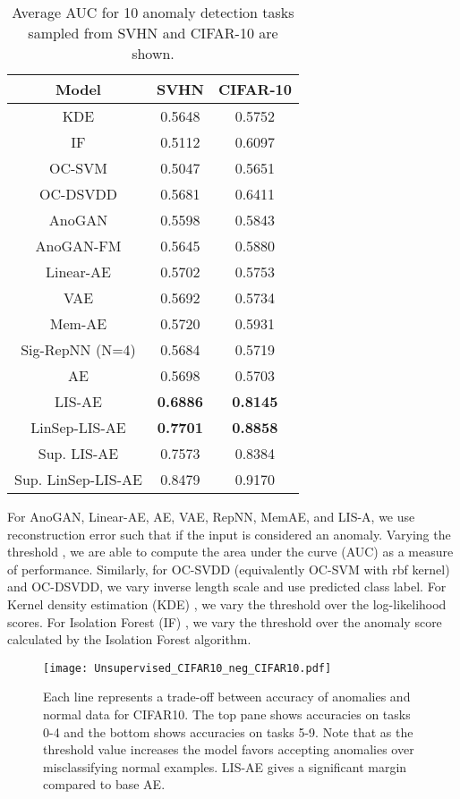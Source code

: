 \documentclass[acmtog, nonacm]{acmart}
\begin{document}
\begin{table}
\label{T2}
\caption{Average AUC for 10 anomaly detection tasks sampled from SVHN and CIFAR-10 are shown.}
\begin{tabular}{c|cc}
  \toprule
  Model & SVHN & CIFAR-10 \\
    \midrule
    KDE                    &0.5648 &0.5752\\
    IF                     &0.5112 &0.6097\\
    OC-SVM                 &0.5047 &0.5651\\
    OC-DSVDD               &0.5681 &0.6411 \\ 
    \midrule
    AnoGAN                 &0.5598&0.5843\\
    AnoGAN-FM              &0.5645&0.5880\\
    Linear-AE              &0.5702 &0.5753\\
    VAE                    &0.5692 &0.5734\\
    Mem-AE                 &0.5720 &0.5931\\
    Sig-RepNN (N=4)        &0.5684 &0.5719\\
    AE                     &0.5698 &0.5703\\
LIS-AE       &\bf0.6886  &\bf0.8145\\
    LinSep-LIS-AE &\bf0.7701 &\bf0.8858\\
    \midrule
    Sup. LIS-AE &0.7573 &0.8384\\
    Sup. LinSep-LIS-AE &0.8479 &0.9170\\
\bottomrule 
\end{tabular}
\end{table}


For AnoGAN, Linear-AE, AE, VAE, RepNN, MemAE, and LIS-A, we use reconstruction error 
such that if  the input is considered an anomaly. 
Varying the threshold , we are able to compute the area under the curve (AUC) as a measure of performance. Similarly, for OC-SVDD (equivalently OC-SVM with rbf kernel) and OC-DSVDD, we vary inverse length scale  and use predicted class label. For Kernel density estimation (KDE) \cite{parzen1962estimation}, we vary the threshold  over the log-likelihood scores. For Isolation Forest (IF) 
\cite{liu2008isolation}, we vary the threshold  over the anomaly score calculated by the Isolation Forest algorithm.  

\begin{figure}
    \centering
    \texttt{[image: Unsupervised\_CIFAR10\_neg\_CIFAR10.pdf]}
    \caption{Each line represents a trade-off between accuracy of anomalies and normal data for CIFAR10. The top pane shows accuracies on tasks 0-4 and the bottom shows accuracies on tasks 5-9. Note that as the threshold value  increases the model favors accepting anomalies over misclassifying normal examples. LIS-AE gives a significant margin compared to base AE.}
    \label{fig:CIFAR10_accuracies}
\end{figure}
\end{document}
